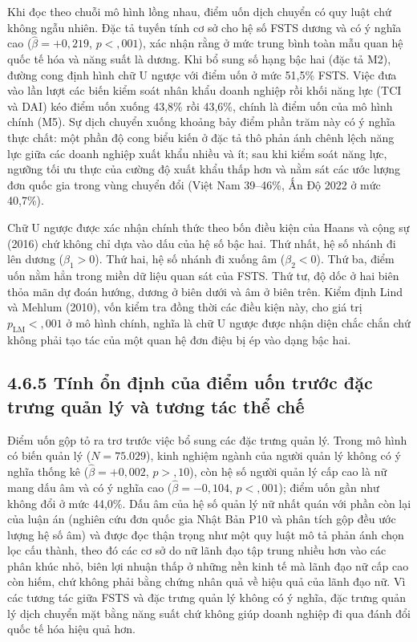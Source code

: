 \documentclass[
  a4paper,
  13pt]{extreport}
\begin{document}
Khi đọc theo chuỗi mô hình lồng nhau, điểm uốn dịch chuyển có quy luật
chứ không ngẫu nhiên. Đặc tả tuyến tính cơ sở cho hệ số FSTS dương và có
ý nghĩa cao (\(\hat{\beta} = +0{,}219\), \(p < {,}001\)), xác nhận rằng
ở mức trung bình toàn mẫu quan hệ quốc tế hóa và năng suất là dương. Khi
bổ sung số hạng bậc hai (đặc tả M2), đường cong định hình chữ U ngược
với điểm uốn ở mức 51,5\% FSTS. Việc đưa vào lần lượt các biến kiểm soát
nhân khẩu doanh nghiệp rồi khối năng lực (TCI và DAI) kéo điểm uốn xuống
43,8\% rồi 43,6\%, chính là điểm uốn của mô hình chính (M5). Sự dịch
chuyển xuống khoảng bảy điểm phần trăm này có ý nghĩa thực chất: một
phần độ cong biểu kiến ở đặc tả thô phản ánh chênh lệch năng lực giữa
các doanh nghiệp xuất khẩu nhiều và ít; sau khi kiểm soát năng lực,
ngưỡng tối ưu thực của cường độ xuất khẩu thấp hơn và nằm sát các ước
lượng đơn quốc gia trong vùng chuyển đổi (Việt Nam 39--46\%, Ấn Độ 2022
ở mức 40,7\%).

Chữ U ngược được xác nhận chính thức theo bốn điều kiện của Haans và
cộng sự (2016) chứ không chỉ dựa vào dấu của hệ số bậc hai. Thứ nhất, hệ
số nhánh đi lên dương (\(\beta_1 > 0\)). Thứ hai, hệ số nhánh đi xuống
âm (\(\beta_2 < 0\)). Thứ ba, điểm uốn nằm hẳn trong miền dữ liệu quan
sát của FSTS. Thứ tư, độ dốc ở hai biên thỏa mãn dự đoán hướng, dương ở
biên dưới và âm ở biên trên. Kiểm định Lind và Mehlum (2010), vốn kiểm
tra đồng thời các điều kiện này, cho giá trị \(p_{\text{LM}} < {,}001\)
ở mô hình chính, nghĩa là chữ U ngược được nhận diện chắc chắn chứ không
phải tạo tác của một quan hệ đơn điệu bị ép vào dạng bậc hai.

\hypertarget{tuxednh-ux1ed5n-ux111ux1ecbnh-cux1ee7a-ux111iux1ec3m-uux1ed1n-trux1b0ux1edbc-ux111ux1eb7c-trux1b0ng-quux1ea3n-luxfd-vuxe0-tux1b0ux1a1ng-tuxe1c-thux1ec3-chux1ebf}{%
\subsection{4.6.5 Tính ổn định của điểm uốn trước đặc trưng quản lý và
tương tác thể
chế}\label{tuxednh-ux1ed5n-ux111ux1ecbnh-cux1ee7a-ux111iux1ec3m-uux1ed1n-trux1b0ux1edbc-ux111ux1eb7c-trux1b0ng-quux1ea3n-luxfd-vuxe0-tux1b0ux1a1ng-tuxe1c-thux1ec3-chux1ebf}}

Điểm uốn gộp tỏ ra trơ trước việc bổ sung các đặc trưng quản lý. Trong
mô hình có biến quản lý (\(N = 75.029\)), kinh nghiệm ngành của người
quản lý không có ý nghĩa thống kê (\(\hat{\beta} = +0{,}002\),
\(p > {,}10\)), còn hệ số người quản lý cấp cao là nữ mang dấu âm và có
ý nghĩa cao (\(\hat{\beta} = -0{,}104\), \(p < {,}001\)); điểm uốn gần
như không đổi ở mức 44,0\%. Dấu âm của hệ số quản lý nữ nhất quán với
phần còn lại của luận án (nghiên cứu đơn quốc gia Nhật Bản P10 và phân
tích gộp đều ước lượng hệ số âm) và được đọc thận trọng như một quy luật
mô tả phản ánh chọn lọc cấu thành, theo đó các cơ sở do nữ lãnh đạo tập
trung nhiều hơn vào các phân khúc nhỏ, biên lợi nhuận thấp ở những nền
kinh tế mà lãnh đạo nữ cấp cao còn hiếm, chứ không phải bằng chứng nhân
quả về hiệu quả của lãnh đạo nữ. Vì các tương tác giữa FSTS và đặc trưng
quản lý không có ý nghĩa, đặc trưng quản lý dịch chuyển mặt bằng năng
suất chứ không giúp doanh nghiệp đi qua đánh đổi quốc tế hóa hiệu quả
hơn.
\end{document}
